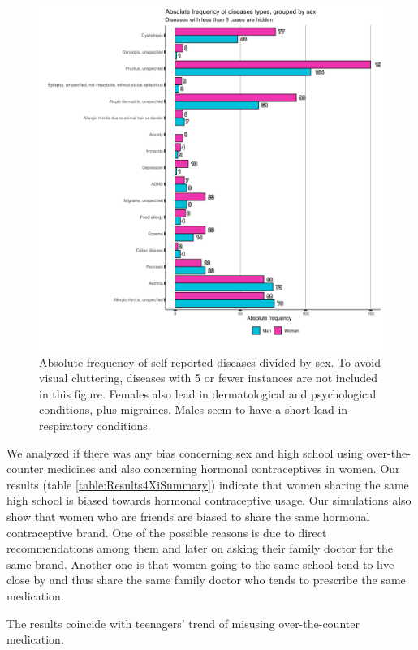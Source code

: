     \begin{figure}[H]
        \centering
            \includegraphics[width=0.9\linewidth]{figures/Results/ResultFour/CombinedLongAbsBarPlot_typesDiseasesBySex_Diagnostic_Sex.png } 
        \caption{Absolute frequency of self-reported diseases divided by sex. To avoid visual cluttering, diseases with 5 or fewer instances are not included in this figure. Females also lead in dermatological and psychological conditions, plus migraines. Males seem to have a short lead in respiratory conditions.}
        \label{figure:Results4B}
    \end{figure}


We analyzed if there was any bias concerning sex and high school using over-the-counter medicines and also concerning hormonal contraceptives in women. Our results (table \ref{table:Results4XiSummary}) indicate that women sharing the same high school is biased towards hormonal contraceptive usage. Our simulations also show that women who are friends are biased to share the same hormonal contraceptive brand. One of the possible reasons is due to direct recommendations among them and later on asking their family doctor for the same brand. Another one is that women going to the same school tend to live close by and thus share the same family doctor who tends to prescribe the same medication.



The results coincide with teenagers' trend of misusing over-the-counter medication.
